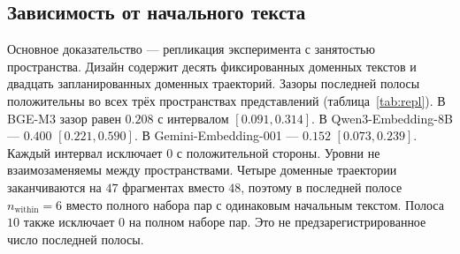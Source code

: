 \documentclass[10pt]{article}
\begin{document}
\subsection{Зависимость от начального текста}
\label{sec:dependence}

Основное доказательство --- репликация эксперимента с занятостью пространства.
Дизайн содержит десять фиксированных доменных текстов
и двадцать запланированных доменных траекторий. %
Зазоры последней полосы положительны во всех трёх пространствах представлений
(таблица~\ref{tab:repl}).
В BGE-M3 зазор равен $0.208$ с интервалом $[0.091, 0.314]$. %
В Qwen3-Embedding-8B --- $0.400$ $[0.221, 0.590]$. %
В Gemini-Embedding-001 --- $0.152$ $[0.073, 0.239]$. %
Каждый интервал исключает $0$ с положительной стороны.
Уровни не взаимозаменяемы между пространствами.
Четыре доменные траектории заканчиваются на $47$ фрагментах вместо $48$,
поэтому в последней полосе $n_{\mathrm{within}}{=}6$ вместо полного
набора пар с одинаковым начальным текстом. %
Полоса $10$ также исключает $0$ на полном наборе пар.
Это не предзарегистрированное число последней полосы. %
\end{document}
